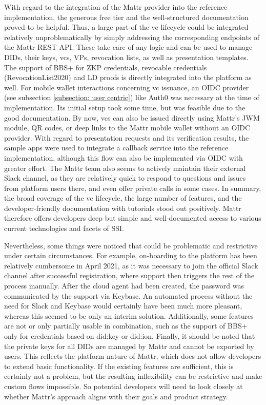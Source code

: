         With regard to the integration of the Mattr provider into the reference implementation, the generous free tier and the well-structured documentation proved to be helpful. Thus, a large part of the \ac{vc} lifecycle could be integrated relatively unproblematically by simply addressing the corresponding endpoints of the Mattr REST API. These take care of any logic and can be used to manage \acp{DID}, their keys, \acp{vc}, \acp{VP}, revocation lists, as well as presentation templates. The support of BBS+ for \ac{ZKP} credentials, revocable credentials (RevocationList2020) and LD proofs is directly integrated into the platform as well. For mobile wallet interactions concerning \ac{vc} issuance, an \ac{OIDC} provider (see subsection \ref{subsection: user centric}) like Auth0 was necessary at the time of implementation. Its initial setup took some time, but was feasible due to the good documentation. By now, \acp{vc} can also be issued directly using Mattr's \ac{JWM} module, QR codes, or deep links to the Mattr mobile wallet without an \ac{OIDC} provider. With regard to presentation requests and its verification results, the sample apps were used to integrate a callback service into the reference implementation, although this flow can also be implemented via \ac{OIDC} with greater effort. The Mattr team also seems to actively maintain their external Slack channel, as they are relatively quick to respond to questions and issues from platform users there, and even offer private calls in some cases. In summary, the broad coverage of the \ac{vc} lifecycle, the large number of features, and the developer-friendly documentation with tutorials stood out positively. Mattr therefore offers developers deep but simple and well-documented access to various current technologies and facets of \ac{SSI}.
    
        Nevertheless, some things were noticed that could be problematic and restrictive under certain circumstances. For example, on-boarding to the platform has been relatively cumbersome in April 2021, as it was necessary to join the official Slack channel after successful registration, where support then triggers the rest of the process manually. After the cloud agent had been created, the password was communicated by the support via Keybase. An automated process without the need for Slack and Keybase would certainly have been much more pleasant, whereas this seemed to be only an interim solution. Additionally, some features are not or only partially usable in combination, such as the support of BBS+ only for credentials based on did:key or did:ion. Finally, it should be noted that the private keys for all \acp{DID} are managed by Mattr and cannot be exported by users. This reflects the platform nature of Mattr, which does not allow developers to extend basic functionality. If the existing features are sufficient, this is certainly not a problem, but the resulting inflexibility can be restrictive and make custom flows impossible. So potential developers will need to look closely at whether Mattr's approach aligns with their goals and product strategy.
    
